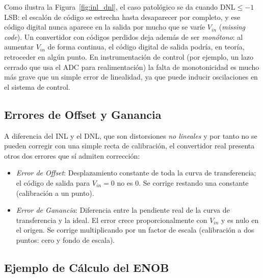 Como ilustra la Figura~\ref{fig:inl_dnl}, el caso patológico se da cuando $\text{DNL} \leq -1$ LSB: el escalón de código se estrecha hasta desaparecer por completo, y ese código digital nunca aparece en la salida por mucho que se varíe $V_{in}$ (\emph{missing code}). Un convertidor con códigos perdidos deja además de ser \emph{monótono}: al aumentar $V_{in}$ de forma continua, el código digital de salida podría, en teoría, retroceder en algún punto. En instrumentación de control (por ejemplo, un lazo cerrado que usa el ADC para realimentación) la falta de monotonicidad es mucho más grave que un simple error de linealidad, ya que puede inducir oscilaciones en el sistema de control.

\subsection{Errores de Offset y Ganancia}\label{sec:offset_ganancia}

A diferencia del INL y el DNL, que son distorsiones \emph{no lineales} y por tanto no se pueden corregir con una simple recta de calibración, el convertidor real presenta otros dos errores que sí admiten corrección:

\begin{itemize}
    \item \emph{Error de \textit{Offset}}: Desplazamiento constante de toda la curva de transferencia; el código de salida para $V_{in}=0$ no es $0$. Se corrige restando una constante (calibración a un punto).
    \item \emph{Error de Ganancia}: Diferencia entre la pendiente real de la curva de transferencia y la ideal. El error crece proporcionalmente con $V_{in}$ y es nulo en el origen. Se corrige multiplicando por un factor de escala (calibración a dos puntos: cero y fondo de escala).
\end{itemize}


\subsection{Ejemplo de Cálculo del ENOB}\label{sec:ejemplo_enob}

